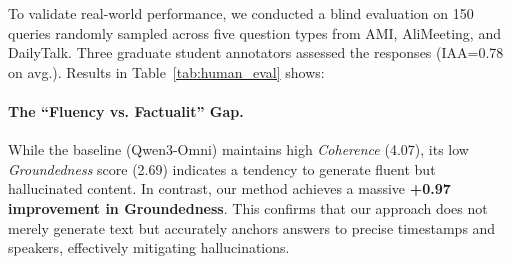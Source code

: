 \documentclass[11pt]{article}
\begin{document}
\begin{table}[t]
\centering
{}
\caption{Human evaluation results across different datasets. Models are assessed on three dimensions: Correctness (Corr.), Groundedness (Grd.), and Coherence (Coh.) using a 1-5 scale. We also report average scores (Avg.) and Inter-Annotator Agreement (IAA).}
\label{tab:human_eval}
\end{table}

To validate real-world performance, we conducted a blind evaluation on 150 queries randomly sampled across five question types from AMI, AliMeeting, and DailyTalk. Three graduate student annotators assessed the responses (IAA=0.78 on avg.). Results in Table~\ref{tab:human_eval} shows:

\paragraph{The ``Fluency vs. Factualit'' Gap.} 
While the baseline (Qwen3-Omni) maintains high \textit{Coherence} (4.07), its low \textit{Groundedness} score (2.69) indicates a tendency to generate fluent but hallucinated content. In contrast, our method achieves a massive \textbf{+0.97 improvement in Groundedness}. This confirms that our approach does not merely generate text but accurately anchors answers to precise timestamps and speakers, effectively mitigating hallucinations.
\end{document}
